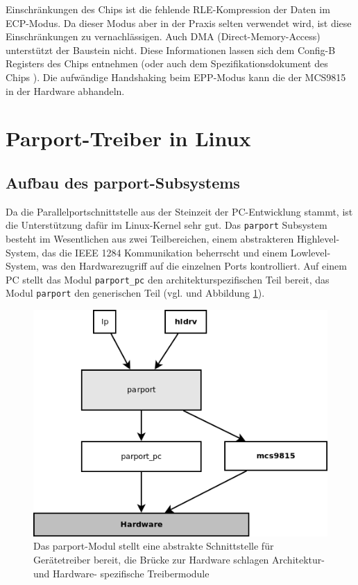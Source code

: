 \documentclass[a4paper,11pt]{article}
\begin{document}
Einschränkungen des Chips ist die fehlende RLE-Kompression der Daten im ECP-Modus. Da dieser Modus aber
in der Praxis selten verwendet wird, ist diese Einschränkungen zu vernachlässigen.
Auch DMA (Direct-Memory-Access) unterstützt der Baustein nicht. Diese Informationen lassen sich dem Config-B Registers des
Chips entnehmen (oder auch dem Spezifikationsdokument des Chips \cite{net:3}).
Die aufwändige Handshaking beim EPP-Modus kann die der MCS9815 in der Hardware abhandeln.

\section{Parport-Treiber in Linux}

\subsection{Aufbau des parport-Subsystems}

Da die Parallelportschnittstelle aus der Steinzeit der PC-Entwicklung stammt, ist die Unterstützung
dafür im Linux-Kernel sehr gut. 
Das \verb|parport| Subsystem besteht im Wesentlichen aus zwei Teilbereichen, einem abstrakteren Highlevel-System, das
die IEEE 1284 Kommunikation beherrscht und einem Lowlevel-System, was den Hardwarezugriff auf die einzelnen Ports
kontrolliert. Auf einem PC stellt das Modul \verb|parport_pc| den architekturspezifischen Teil bereit, das Modul \verb|parport| 
den generischen Teil (vgl. \cite{net:1} und Abbildung \ref{fig:parport_struktur}).

\begin{figure}[h!]
 \centering
 \includegraphics[scale=0.7,bb=0 0 493 380]{./pics/parport_struktur.png}
 \caption{Das parport-Modul stellt eine abstrakte Schnittstelle für Gerätetreiber bereit, die Brücke zur Hardware schlagen Architektur- und Hardware-
spezifische Treibermodule}
\label{fig:parport_struktur}
\end{figure}
\end{document}
